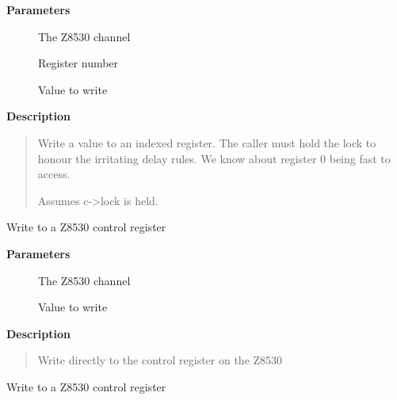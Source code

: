 \documentclass[a4paper,8pt,english]{sphinxmanual}
\begin{document}
\textbf{Parameters}
\begin{description}
\item[{}] \leavevmode
The Z8530 channel

\item[{}] \leavevmode
Register number

\item[{}] \leavevmode
Value to write

\end{description}

\textbf{Description}
\begin{quote}

Write a value to an indexed register. The caller must hold the lock
to honour the irritating delay rules. We know about register 0
being fast to access.

Assumes c-\textgreater{}lock is held.
\end{quote}

\begin{fulllineitems}
\label{networking/z8530book:c.write_zsctrl}
Write to a Z8530 control register

\end{fulllineitems}


\textbf{Parameters}
\begin{description}
\item[{}] \leavevmode
The Z8530 channel

\item[{}] \leavevmode
Value to write

\end{description}

\textbf{Description}
\begin{quote}

Write directly to the control register on the Z8530
\end{quote}

\begin{fulllineitems}
\label{networking/z8530book:c.write_zsdata}
Write to a Z8530 control register

\end{fulllineitems}
\end{document}
